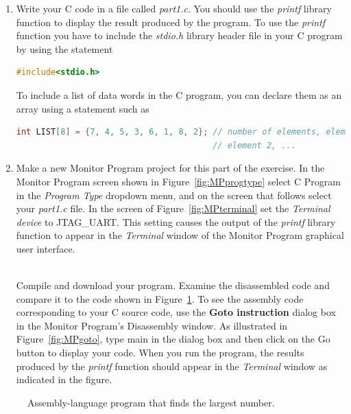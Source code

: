 \documentclass[epsfig,10pt,fullpage]{article}
\begin{document}
\begin{enumerate}
\item
Write your C code in a file called {\it part1.c}.  You should use the {\it printf}
library function to display the result produced by the program. To use the {\it printf} function 
you have to include the {\it stdio.h} library header file in your C program by using the statement

\begin{lstlisting}[language=C]
#include<stdio.h>
\end{lstlisting}

To include a list of data words in the C program, you can declare them as an array using
a statement such as

\begin{lstlisting}[language=C]
int LIST[8] = {7, 4, 5, 3, 6, 1, 8, 2}; // number of elements, element 1,
                                        // element 2, ...
\end{lstlisting}

\item
Make a new Monitor Program project for 
this part of the exercise. In the Monitor Program screen shown in
Figure~\ref{fig:MPprogtype} select {\sf C Program} in the {\it Program Type}
dropdown menu, and on the screen that follows select your {\it part1.c} file. In the screen of 
Figure~\ref{fig:MPterminal} set the {\it Terminal device} to {\sf JTAG\_UART}.
This setting causes the output of the {\it printf} library function to appear 
in the {\it Terminal} window of the Monitor Program graphical user interface.

~\\
Compile and download your program. Examine the disassembled code and compare it
to the code shown in Figure~\ref{fig:code}. To see the assembly code corresponding to your 
C source code, use the {\bf Goto instruction} dialog box in the Monitor Program's Disassembly
window. As illustrated in Figure~\ref{fig:MPgoto}, type {\sf main} in the dialog box and then 
click on the {\sf Go} button to display your code. When you run the program, the results
produced by the {\it printf} function should appear in the {\it Terminal} window as indicated 
in the figure.
\end{enumerate}

\begin{figure}[H]
\begin{center}

\end{center}
\caption{Assembly-language program that finds the largest number.}
\label{fig:code}
\end{figure}
\end{document}
